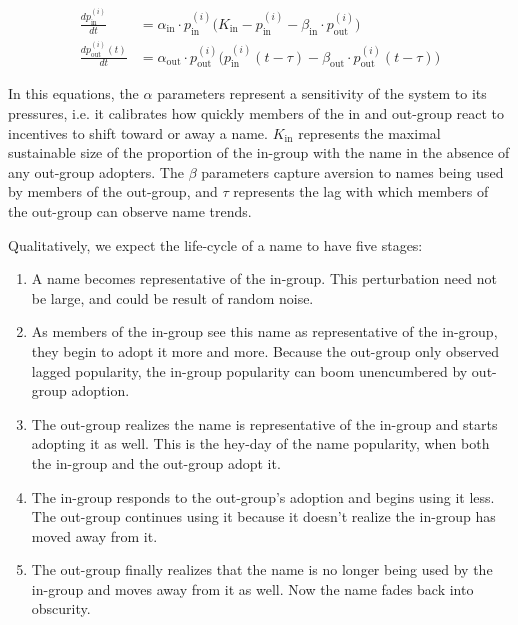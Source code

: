 \documentclass[a4paper]{article}
\begin{document}
\begin{align*}
\frac{d p_\text{in}^{(i)}}{dt} &= \alpha_\text{in} \cdot p_\text{in}^{(i)}
\bigg(K_\text{in} - p_\text{in}^{(i)} - \beta_\text{in} \cdot
p_\text{out}^{(i)}\bigg) \\
\frac{d p_\text{out}^{(i)}(t)}{dt} &= \alpha_\text{out} \cdot p_\text{out}^{(i)}
\bigg( p_\text{in}^{(i)}(t-\tau) - \beta_\text{out} \cdot
p_\text{out}^{(i)}(t-\tau) \bigg)
\end{align*}

In this equations, the $\alpha$ parameters represent a sensitivity of the system
to its pressures, i.e. it calibrates how quickly members of the in and out-group
react to incentives to shift toward or away a name. $K_\text{in}$ represents the
maximal sustainable size of the proportion of the in-group with the name in the
absence of any out-group adopters. The $\beta$ parameters capture aversion to
names being used by members of the out-group, and $\tau$ represents the lag with
which members of the out-group can observe name trends.

Qualitatively, we expect the life-cycle of a name to have five stages:

\begin{enumerate}
\item A name becomes representative of the in-group. This perturbation need not
be large, and could be result of random noise.

\item As members of the in-group see this name as representative of the
in-group, they begin to adopt it more and more. Because the out-group only
observed lagged popularity, the in-group popularity can boom unencumbered by
out-group adoption.

\item The out-group realizes the name is representative of the in-group and
starts adopting it as well. This is the hey-day of the name popularity, when
both the in-group and the out-group adopt it.

\item The in-group responds to the out-group's adoption and begins using it
less. The out-group continues using it because it doesn't realize the in-group
has moved away from it.

\item The out-group finally realizes that the name is no longer being used by
the in-group and moves away from it as well. Now the name fades back into
obscurity.
\end{enumerate}
\end{document}
